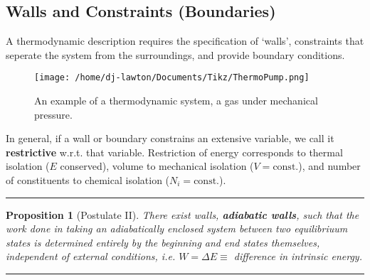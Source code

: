 \documentclass{article}
\newtheorem{theorem}{Proposition}[section]
\theoremstyle{definition}
\theoremstyle{remark}
\begin{document}
\subsection[short]{Walls and Constraints (Boundaries)}
A thermodynamic description requires the specification of `walls', constraints that seperate the system from the surroundings, and provide boundary conditions.
\begin{figure}[H]
    \centering
    \texttt{[image: /home/dj-lawton/Documents/Tikz/ThermoPump.png]}
    \caption{\label{fig:ThermoPump}An example of a thermodynamic system, a gas under mechanical pressure.}
\end{figure}
In general, if a wall or boundary constrains an extensive variable, we call it \textbf{restrictive} w.r.t. that variable. Restriction of energy corresponds to thermal isolation ($E$ conserved), volume to mechanical isolation ($V=\text{const.}$), and number of constituents to chemical isolation ($N_i=\text{const.}$).
\vspace{0.5cm}
\hrule
\begin{theorem}[Postulate II]
    There exist walls, \textbf{adiabatic walls}, such that the work done in taking an adiabatically enclosed system between two equilibriuum states is determined entirely by the beginning and end states themselves, independent of external conditions, i.e. $W=\Delta E \equiv $ difference in intrinsic energy.
\end{theorem}
\hrule
\vspace{0.5cm}
\end{document}
